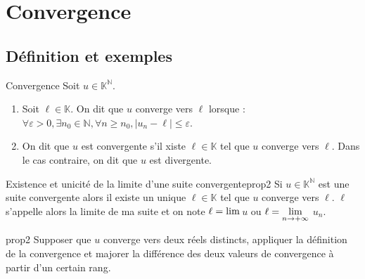 \documentclass[12pt,a4paper]{report}
\begin{document}
\newpage

\section{Convergence}
\subsection{Définition et exemples}

\begin{definition}{Convergence}{}
Soit $u \in \mathbb{K}^\mathbb{N}$.
\begin{enumerate}
\item Soit $\ell \in \mathbb{K}$. On dit que $u$ converge vers $\ell$ lorsque : $\forall \varepsilon > 0, \exists n_0 \in \mathbb{N}, \forall n \geq n_0, \lvert u_n - \ell \rvert \leq \varepsilon$.
\item On dit que $u$ est convergente s'il xiste $\ell \in \mathbb{K}$ tel que $u$ converge vers $\ell$. Dans le cas contraire, on dit que $u$ est divergente.
\end{enumerate}
\end{definition}

\begin{proposition}{Existence et unicité de la limite d'une suite convergente}{prop2}
Si $u \in \mathbb{K}^\mathbb{N}$ est une suite convergente alors il existe un unique $\ell \in \mathbb{K}$ tel que $u$ converge vers $\ell$. $\ell$ s'appelle alors la limite de ma suite et on note $\ell = \rm{lim}$\,$u$ ou $\ell = \underset{n \rightarrow +\infty}{\rm{lim}}$ $u_n$.
\end{proposition}

\begin{principedemo}{prop2}
Supposer que $u$ converge vers deux réels distincts, appliquer la définition de la convergence et majorer la différence des deux valeurs de convergence à partir d'un certain rang.
\end{principedemo}
\end{document}
